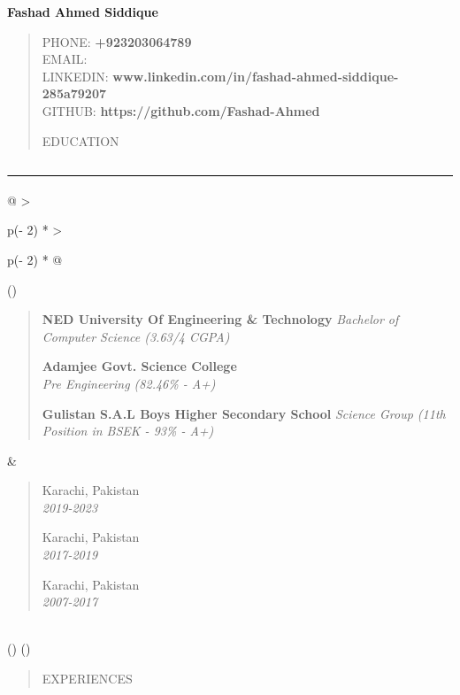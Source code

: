 \documentclass[
]{article}
\author{}
\date{}
\begin{document}
\textbf{Fashad Ahmed Siddique}

\begin{quote}
PHONE: \textbf{+923203064789}\\
EMAIL:\\
LINKEDIN: \textbf{www.linkedin.com/in/fashad-ahmed-siddique-285a79207}\\
GITHUB: \textbf{https://github.com/Fashad-Ahmed}

EDUCATION
\end{quote}

\includegraphics[width=7.5in,height=\textheight]{vertopal_6d2e6bfb3b634523a1faf107b161d186/media/image1.png}

\begin{longtable}[]{@{}
  >{\raggedright\arraybackslash}p{(\columnwidth - 2\tabcolsep) * }
  >{\raggedright\arraybackslash}p{(\columnwidth - 2\tabcolsep) * }@{}}
\toprule()
\begin{minipage}[b]{\linewidth}\raggedright
\begin{quote}
\textbf{NED University Of Engineering \& Technology} \emph{Bachelor of
Computer Science (3.63/4 CGPA)}

\textbf{Adamjee Govt. Science College}\\
\emph{Pre Engineering (82.46\% - A+)}

\textbf{Gulistan S.A.L Boys Higher Secondary School} \emph{Science Group
(11th Position in BSEK - 93\% - A+)}
\end{quote}\strut
\end{minipage} & \begin{minipage}[b]{\linewidth}\raggedright
\begin{quote}
Karachi, Pakistan\\
\emph{2019-2023}

Karachi, Pakistan\\
\emph{2017-2019}

Karachi, Pakistan\\
\emph{2007-2017}
\end{quote}\strut
\end{minipage} \\
\midrule()
\endhead
\bottomrule()
\end{longtable}

\begin{quote}
EXPERIENCES
\end{quote}
\end{document}
